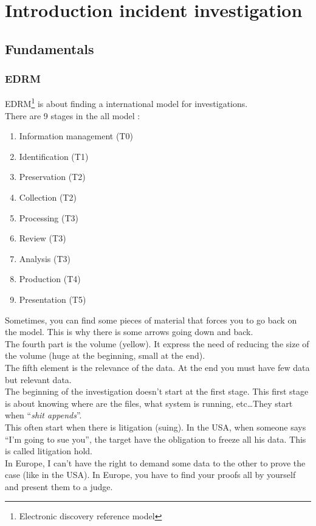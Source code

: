 \section{Introduction incident investigation}
\subsection{Fundamentals}
\subsubsection{EDRM}
EDRM\footnote{Electronic discovery reference model} is about finding a international model for investigations.\\
There are 9 stages in the all model :
\begin{enumerate}
 \item Information management (T0)
 \item Identification (T1)
 \item Preservation (T2)
 \item Collection (T2)
 \item Processing (T3)
 \item Review (T3)
 \item Analysis (T3)
 \item Production (T4)
 \item Presentation (T5)
\end{enumerate}
Sometimes, you can find some pieces of material that forces you to go back on the model. This is why there is some arrows going down and back.\\
The fourth part is the volume (yellow). It express the need of reducing the size of the volume (huge at the beginning, small at the end).\\
The fifth element is the relevance of the data. At the end you must have few data but relevant data.\\
The beginning of the investigation doesn't start at the first stage. This first stage is about knowing where are the files, what system is running, etc\ldots They start when \enquote{\textit{shit appends}}.\\
This often start when there is litigation (suing). In the USA, when someone says \enquote{I'm going to sue you}, the target have the obligation to freeze all his data. This is called litigation hold.\\
In Europe, I can't have the right to demand some data to the other to prove the case (like in the USA). In Europe, you have to find your proofs all by yourself and present them to a judge.
